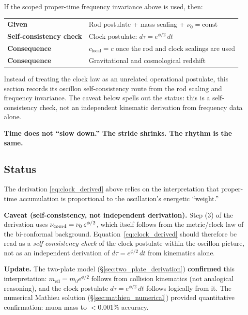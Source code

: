 \documentclass[11pt]{article}
\begin{document}
If the scoped proper-time frequency invariance above is used,
then:
\begin{center}
\renewcommand{\arraystretch}{1.3}
\begin{tabular}{@{}ll@{}}
\textbf{Given} & Rod postulate + mass scaling
  + $\nu_0 = \mathrm{const}$ \\
\textbf{Self-consistency check} & Clock postulate:
  $d\tau = e^{\phi/2}\,dt$ \\
\textbf{Consequence} & $c_{\mathrm{local}} = c$ once the rod
  and clock scalings are used \\
\textbf{Consequence} & Gravitational and cosmological
  redshift \\
\end{tabular}
\end{center}

Instead of treating the clock law as an unrelated operational
postulate, this section records its oscillon self-consistency route
from the rod scaling and frequency invariance.  The caveat below
spells out the status: this is a self-consistency check, not an
independent kinematic derivation from frequency data alone.

\textbf{Time does not ``slow down.'' The stride shrinks. The
rhythm is the same.}

\subsection{Status}

The derivation \eqref{eq:clock_derived} above relies on the
interpretation that proper-time accumulation is proportional to the
oscillation's energetic ``weight.''

\textbf{Caveat (self-consistency, not independent derivation).}
Step (3) of the derivation uses
$\nu_{\rm coord} = \nu_0\,e^{\phi/2}$, which itself follows
from the metric/clock law of the bi-conformal background.
Equation~\eqref{eq:clock_derived} should therefore be read as
a \emph{self-consistency check} of the clock postulate within
the oscillon picture, not as an independent derivation of
$d\tau = e^{\phi/2}\,dt$ from kinematics alone.

\textbf{Update.}
The two-plate model (\S\ref{sec:two_plate_derivation})
\textbf{confirmed} this interpretation:
$m_{\mathrm{eff}} = m_0 e^{\phi/2}$ follows from collision
kinematics (not analogical reasoning), and the clock postulate
$d\tau = e^{\phi/2}\,dt$ follows logically from it. The numerical
Mathieu solution (\S\ref{sec:mathieu_numerical}) provided
quantitative confirmation: muon mass to $< 0.001\%$ accuracy.
\end{document}
